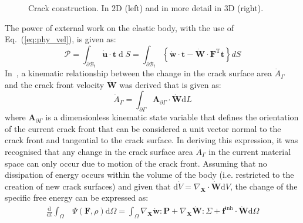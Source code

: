 \documentclass[onecolumn]{svjour3}
\begin{document}
\begin{figure}[th]
\setlength{\fboxsep}{0pt}%
\setlength{\fboxrule}{0pt}%
\begin{center}
\def\svgwidth{7cm} 	 
\end{center}
\caption{Crack construction. In 2D (left) and in more detail in 3D (right).}
\label{fig:crac_surf_construct} 
\end{figure}
% 
% 
The power of external work on the elastic body, with the use of Eq.~(\ref{eq:phy_vel}), is given as: 
\begin{equation} \label{eq:extern_pow}
	\mathscr{P} =\int_{\partial \mathscr{B}_{t}} \dot{\mathbf{u}} \cdot \mathbf{t} \operatorname{d} S=\int_{\partial \mathscr{B}_{t}}\left\{\dot{\mathbf{w}} \cdot \mathbf{t}-\dot{\mathbf{W}} \cdot \mathbf{F}^{\mathrm{T}} \mathbf{t}\right\} d S
\end{equation}
% 
In~\cite{kaczmarczyk2017energy}, a kinematic relationship between the change in the
crack surface area $\dot{A}_\Gamma$ and the crack front velocity $\dot{\mathbf{W}}$ was derived that is given as:
\begin{equation}
\label{eq::Agamma2}
\dot{A}_\Gamma
 =
\int_{\partial\Gamma}
\mathbf{A}_{\partial\Gamma} \cdot \dot{\mathbf{W}} \textrm{d}L
\end{equation}
where 
$\mathbf{A}_{\partial\Gamma}$ is a dimensionless kinematic state variable that defines the orientation of the current crack front that can be considered a unit vector normal to the crack front and tangential to the crack surface. In deriving this expression, it was recognised that any change in the crack surface area $\dot{A}_\Gamma$ in the current material space can only occur due to motion of the crack front.
% 
Assuming that no dissipation of energy occurs within the volume of the body (i.e. restricted to the creation of new crack surfaces) and given that $\mathrm d \dot V = \nabla _{\mathbf X} \cdot \mathbf{\dot W} \mathrm d V$, the change of the specific free energy can be expressed as:
\begin{equation} \label{eq:psi_time}
	\begin{aligned}
		\frac{\mathrm{d}}{\mathrm{d} t} \int_{\Omega} & \Psi(\mathbf{F}, \rho) \mathrm{d} \Omega =
		 \int_{\Omega} \nabla_{\mathbf{X}} \dot{\mathbf{w}}: \mathbf{P} 
		+ \nabla_{\mathbf{X}} \dot{\mathbf{W}}: \Sigma 
		+ \mathbf f^\mathrm{inh} \cdot \dot{\mathbf{W}} \mathrm{d} \Omega
	\end{aligned}
	\end{equation}
\end{document}

